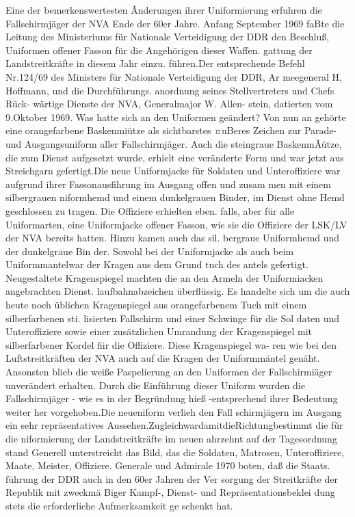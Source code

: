 

Eine der bemerkenswertesten Ãnderungen ihrer
Uniformierung erfuhren die Fallschirmjäger der
NVA Ende der 60er Jahre. Anfang September 1969
faBte die Leitung des Ministeriums für Nationale
Verteidigung der DDR den Beschluß, Uniformen
offener Fasson für die Angehörigen dieser Waffen.
gattung der Landstreitkräfte in diesem Jahr einzu.
führen.Der entsprechende Befehl Nr.124/69 des
Ministers für Nationale Verteidigung der DDR, Ar
meegeneral H, Hoffmann, und die Durchführungs.
anordnung seines Stellvertreters und Chefs Rück-
wärtige Dienste der NVA, Generalmajor W. Allen-
stein, datierten vom 9.Oktober 1969.
Was hatte sich an den Uniformen geändert? Von
nun an gehörte eine orangefarbene Baskenmiütze
als sichtbarstes ¤uBeres Zeichen zur Parade- und
Ausgangsuniform aller Fallschirmjäger. Auch die
steingraue BaskenmÃütze, die zum Dienst aufgesetzt wurde, erhielt eine veränderte Form und war jetzt
aus Streichgarn gefertigt.Die neue Uniformjacke
für Soldaten und Unteroffiziere war aufgrund ihrer
Fassonausfihrung im Ausgang offen und zusam
men mit einem silbergrauen niformhemd und
einem dunkelgrauen Binder, im Dienst ohne Hemd
geschlossen zu tragen. Die Offiziere erhielten eben.
falls, aber für alle Uniformarten, eine Uniformjacke
offener Fasson, wie sie die Offiziere der LSK/LV
der NVA bereits hatten. Hinzu kamen auch das sil.
bergraue Uniformhemd und der dunkelgraue Bin
der. Sowohl bei der Uniformjacke als auch beim
Uniformmantelwar der Kragen aus dem Grund
tuch des antels gefertigt.
Neugestaltete Kragenspiegel machten die an den
Armeln der Uniformiacken angebrachten Dienst.
laufbahnabzeichen überflüssig. Es handelte sich um
die auch heute noch üblichen Kragenspiegel aus
orangefarbenem Tuch mit einem silberfarbenen sti.
lisierten Fallschirm und einer Schwinge für die Sol
daten und Unteroffiziere sowie einer zusätzlichen
Umrandung der Kragenspiegel mit silberfarbener
Kordel fiir die Offiziere. Diese Kragenspiegel wa-
ren wie bei den Luftstreitkräften der NVA auch auf
die Kragen der Uniformmäntel genäht. Ansonsten
blieb die weiße Paspelierung an den Uniformen der
Fallschirmiäger unverändert erhalten.
Durch die Einführung dieser Uniform wurden
die Fallschirmjäger - wie es in der Begründung
hieß -entsprechend ihrer Bedeutung weiter her
vorgehoben.Die neueniform verlieh den Fall
schirmjägern im Ausgang ein sehr repräsentatives
Aussehen.ZugleichwardamitdieRichtungbestimmt
die fǔr die niformierung der Landstreitkräfte
im neuen ahrzehnt auf der Tagesordnung stand
Generell unterstreicht das Bild, das die Soldaten,
Matrosen, Unteroffiziere, Maate, Meister, Offiziere.
Generale und Admirale 1970 boten, daß die Staats.
führung der DDR auch in den 60er Jahren der Ver
sorgung der Streitkräfte der Republik mit zweckmä
Biger Kampf-, Dienst- und Repräsentationsbeklei
dung stets die erforderliche Aufmerksamkeit ge
schenkt hat.